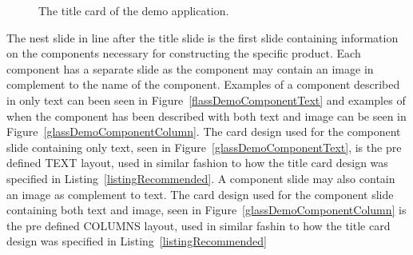 		\begin{figure}[ht!]
		\centering
   		 \qquad
   		 \qquad
		\caption{The title card of the demo application.}
		\label{glassDemoTitleCard}
	\end{figure}
	
The nest slide in line after the title slide is the first slide containing information on the components necessary for constructing the specific product. Each component has a separate slide as the component may contain an image in complement to the name of the component. Examples of a component described in only text can been seen in Figure~\ref{flassDemoComponentText} and examples of when the component has been described with both text and image can be seen in Figure~\ref{glassDemoComponentColumn}.
The card design used for the component slide containing only text, seen in Figure~\ref{glassDemoComponentText}, is the pre defined TEXT layout, used in similar fashion to how the title card design was specified in Listing~\ref{listingRecommended}. A component slide may also contain an image as complement to text. The card design used for the component slide containing both text and image, seen in Figure~\ref{glassDemoComponentColumn} is the pre defined COLUMNS layout, used in similar fashin to how the title card design was specified in Listing~\ref{listingRecommended}

